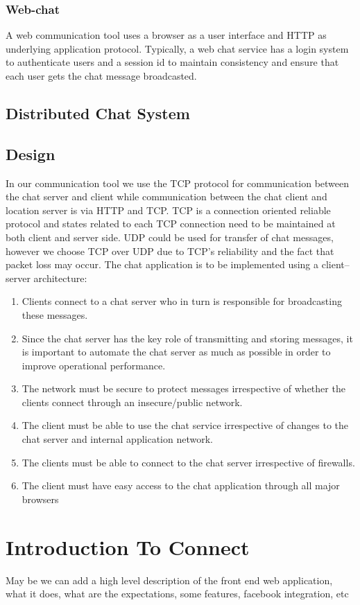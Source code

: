 \documentclass[12pt, twocolumn]{article}
\begin{document}
\subsubsection{Web-chat}
A web communication tool uses a browser as a user interface and HTTP as underlying application protocol. Typically, a web chat service has a login system to authenticate users and a session id to maintain consistency and ensure that each user gets the chat message broadcasted.
\subsection{Distributed Chat System}
\subsection{Design}
In our communication tool we use the TCP protocol for communication between the chat server and client while communication between the chat client and location server is via HTTP and TCP. TCP is a connection oriented reliable protocol and states related to each TCP connection need to be maintained at both client and server side. UDP could be used for transfer of chat messages, however we choose TCP over UDP due to TCP's reliability and the fact that packet loss may occur. 
The chat application is to be implemented using a client–server architecture:
\begin{enumerate}
\item Clients connect to a chat server who in turn is responsible for broadcasting these messages.
\item Since the chat server has the key role of transmitting and storing
messages, it is important to automate the chat server as much as possible in
order to improve operational performance.
\item The network must be secure to protect messages irrespective of whether the
clients connect through an insecure/public network.
\item The client must be able to use the chat service irrespective of changes to
the chat server and internal application network.
\item The clients must be able to connect to the chat server irrespective of
firewalls.
\item The client must have easy access to the chat application through all major
browsers
\end{enumerate}
\section {Introduction To Connect}
May be we can add a high level description of the front end web application, what it does, what are the expectations, some features, facebook integration, etc 
\end{document}
